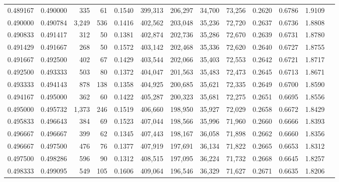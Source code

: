 \begin{tabular}{rrrrrrrrrrrrr}
0.489167 & 0.490000 &   335 &  61 &                                     0.1540 & 399,313 & 206,297 &  34,700 &  73,256 & 0.2620 & 0.6786 & 1.9109 \\
0.490000 & 0.490784 & 3,249 & 536 &                                     0.1416 & 402,562 & 203,048 &  35,236 &  72,720 & 0.2637 & 0.6736 & 1.8808 \\
0.490833 & 0.491417 &   312 &  50 &                                     0.1381 & 402,874 & 202,736 &  35,286 &  72,670 & 0.2639 & 0.6731 & 1.8780 \\
0.491429 & 0.491667 &   268 &  50 &                                     0.1572 & 403,142 & 202,468 &  35,336 &  72,620 & 0.2640 & 0.6727 & 1.8755 \\
0.491667 & 0.492500 &   402 &  67 &                                     0.1429 & 403,544 & 202,066 &  35,403 &  72,553 & 0.2642 & 0.6721 & 1.8717 \\
0.492500 & 0.493333 &   503 &  80 &                                     0.1372 & 404,047 & 201,563 &  35,483 &  72,473 & 0.2645 & 0.6713 & 1.8671 \\
0.493333 & 0.494143 &   878 & 138 &                                     0.1358 & 404,925 & 200,685 &  35,621 &  72,335 & 0.2649 & 0.6700 & 1.8590 \\
0.494167 & 0.495000 &   362 &  60 &                                     0.1422 & 405,287 & 200,323 &  35,681 &  72,275 & 0.2651 & 0.6695 & 1.8556 \\
0.495000 & 0.495732 & 1,373 & 246 &                                     0.1519 & 406,660 & 198,950 &  35,927 &  72,029 & 0.2658 & 0.6672 & 1.8429 \\
0.495833 & 0.496643 &   384 &  69 &                                     0.1523 & 407,044 & 198,566 &  35,996 &  71,960 & 0.2660 & 0.6666 & 1.8393 \\
0.496667 & 0.496667 &   399 &  62 &                                     0.1345 & 407,443 & 198,167 &  36,058 &  71,898 & 0.2662 & 0.6660 & 1.8356 \\
0.496667 & 0.497500 &   476 &  76 &                                     0.1377 & 407,919 & 197,691 &  36,134 &  71,822 & 0.2665 & 0.6653 & 1.8312 \\
0.497500 & 0.498286 &   596 &  90 &                                     0.1312 & 408,515 & 197,095 &  36,224 &  71,732 & 0.2668 & 0.6645 & 1.8257 \\
0.498333 & 0.499095 &   549 & 105 &                                     0.1606 & 409,064 & 196,546 &  36,329 &  71,627 & 0.2671 & 0.6635 & 1.8206 \\

\end{tabular}
